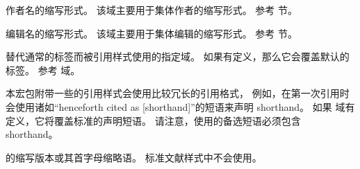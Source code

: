 \begin{fieldlist}

作者名的缩写形式。
该域主要用于集体作者的缩写形式。
参考  节。




编辑名的缩写形式。
该域主要用于集体编辑的缩写形式。
参考  节。




替代通常的标签而被引用样式使用的指定域。
如果有定义，那么它会覆盖默认的标签。
参考  域。




本宏包附带一些的引用样式会使用比较冗长的引用格式，
例如，在第一次引用时会使用诸如“henceforth cited as [shorthand]”的短语来声明 shorthand。
如果  域有定义，它将覆盖标准的声明短语。
请注意，使用的备选短语必须包含 shorthand。




 的缩写版本或其首字母缩略语。
标准文献样式中不会使用。




\end{fieldlist}
